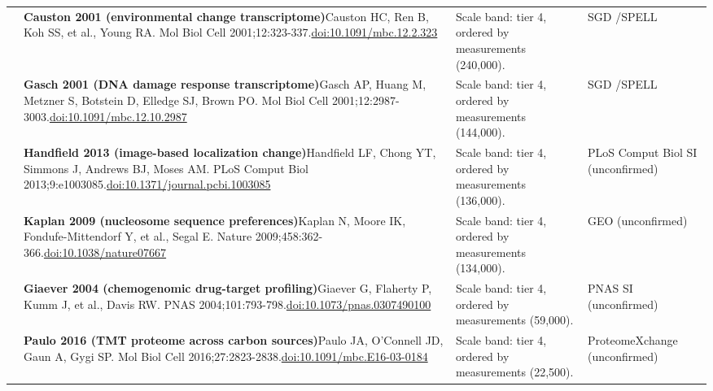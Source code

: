\begin{landscape}
\begin{longtable}{@{}r@{\hspace{4pt}} L{86mm} L{92mm} L{62mm}@{}}
 & \textbf{Causton 2001 (environmental change transcriptome)}\newline Causton HC, Ren B, Koh SS, et al., Young RA. Mol Biol Cell 2001;12:323-337.\newline \href{https://doi.org/10.1091/mbc.12.2.323}{doi:10.1091/\allowbreak mbc.12.2.323} & Scale band: tier 4, ordered by measurements (240,000). & SGD /\allowbreak  SPELL \\
 & \textbf{Gasch 2001 (DNA damage response transcriptome)}\newline Gasch AP, Huang M, Metzner S, Botstein D, Elledge SJ, Brown PO. Mol Biol Cell 2001;12:2987-3003.\newline \href{https://doi.org/10.1091/mbc.12.10.2987}{doi:10.1091/\allowbreak mbc.12.10.2987} & Scale band: tier 4, ordered by measurements (144,000). & SGD /\allowbreak  SPELL \\
 & \textbf{Handfield 2013 (image-based localization change)}\newline Handfield LF, Chong YT, Simmons J, Andrews BJ, Moses AM. PLoS Comput Biol 2013;9:e1003085.\newline \href{https://doi.org/10.1371/journal.pcbi.1003085}{doi:10.1371/\allowbreak journal.pcbi.1003085} & Scale band: tier 4, ordered by measurements (136,000). & PLoS Comput Biol SI (unconfirmed) \\
 & \textbf{Kaplan 2009 (nucleosome sequence preferences)}\newline Kaplan N, Moore IK, Fondufe-Mittendorf Y, et al., Segal E. Nature 2009;458:362-366.\newline \href{https://doi.org/10.1038/nature07667}{doi:10.1038/\allowbreak nature07667} & Scale band: tier 4, ordered by measurements (134,000). & GEO (unconfirmed) \\
 & \textbf{Giaever 2004 (chemogenomic drug-target profiling)}\newline Giaever G, Flaherty P, Kumm J, et al., Davis RW. PNAS 2004;101:793-798.\newline \href{https://doi.org/10.1073/pnas.0307490100}{doi:10.1073/\allowbreak pnas.0307490100} & Scale band: tier 4, ordered by measurements (59,000). & PNAS SI (unconfirmed) \\
 & \textbf{Paulo 2016 (TMT proteome across carbon sources)}\newline Paulo JA, O'Connell JD, Gaun A, Gygi SP. Mol Biol Cell 2016;27:2823-2838.\newline \href{https://doi.org/10.1091/mbc.E16-03-0184}{doi:10.1091/\allowbreak mbc.E16-03-0184} & Scale band: tier 4, ordered by measurements (22,500). & ProteomeXchange (unconfirmed) \\

\end{longtable}
\end{landscape}
